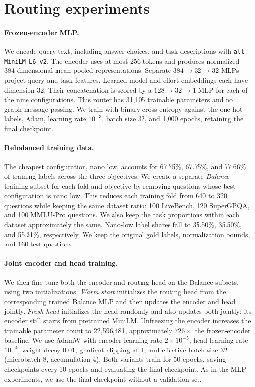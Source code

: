 \documentclass{article}
\begin{document}
\section{Routing experiments}
\paragraph{Frozen-encoder MLP.} We encode query text, including answer choices, and task descriptions with \texttt{all-MiniLM-L6-v2}. The encoder uses at most 256 tokens and produces normalized 384-dimensional mean-pooled representations. Separate $384\!\rightarrow\!32\!\rightarrow\!32$ MLPs project query and task features. Learned model and effort embeddings each have dimension 32. Their concatenation is scored by a $128\!\rightarrow\!32\!\rightarrow\!1$ MLP for each of the nine configurations. This router has 31,105 trainable parameters and no graph message passing. We train with binary cross-entropy against the one-hot labels, Adam, learning rate $10^{-3}$, batch size 32, and 1,000 epochs, retaining the final checkpoint.

\paragraph{Rebalanced training data.} The cheapest configuration, nano low, accounts for 67.75\%, 67.75\%, and 77.66\% of training labels across the three objectives. We create a separate \emph{Balance} training subset for each fold and objective by removing questions whose best configuration is nano low. This reduces each training fold from 640 to 320 questions while keeping the same dataset ratio: 100 LiveBench, 120 SuperGPQA, and 100 MMLU-Pro questions. We also keep the task proportions within each dataset approximately the same. Nano-low label shares fall to 35.50\%, 35.50\%, and 55.31\%, respectively. We keep the original gold labels, normalization bounds, and 160 test questions.

\paragraph{Joint encoder and head training.} We then fine-tune both the encoder and routing head on the Balance subsets, using two initializations. \emph{Warm start} initializes the routing head from the corresponding trained Balance MLP and then updates the encoder and head jointly. \emph{Fresh head} initializes the head randomly and also updates both jointly; its encoder still starts from pretrained MiniLM. Unfreezing the encoder increases the trainable parameter count to 22,596,481, approximately $726\times$ the frozen-encoder baseline. We use AdamW with encoder learning rate $2\times10^{-5}$, head learning rate $10^{-4}$, weight decay 0.01, gradient clipping at 1, and effective batch size 32 (microbatch 8, accumulation 4). Both variants train for 50 epochs, saving checkpoints every 10 epochs and evaluating the final checkpoint. As in the MLP experiments, we use the final checkpoint without a validation set.
\end{document}
